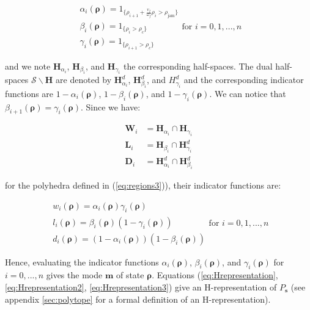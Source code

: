 \begin{equation}
\begin{array}{l}
\alpha_{i}(\boldsymbol\rho)=1_{\{\rho_{i+1} + \frac{v_{f}}{\omega_{f}}\rho_{i}>\rho_{\text{jam}}\}}\\
\beta_{i}(\boldsymbol\rho)=1_{\{\rho_{i}>\rho_{c}\}}\\
\gamma_{i}(\boldsymbol\rho)=1_{\{\rho_{i+1}>\rho_{c}\}}
\end{array}
\text{for }i=0,1,...,n
\label{eq:indicators}
\end{equation}

\noindent and we note $\textbf{H}_{\alpha_{i}}$, $\textbf{H}_{\beta_{i}}$, and $\textbf{H}_{\gamma_{i}}$ the corresponding half-spaces. The dual half-spaces $\mathcal{S}\backslash \textbf{H}$ are denoted by $\textbf{H}^{d}_{\alpha_{i}}$, $\textbf{H}^{d}_{\beta_{i}}$, and $H^{d}_{\gamma_{i}}$ and the corresponding indicator functions are $1-\alpha_{i}(\boldsymbol\rho)$, $1-\beta_{i}(\boldsymbol\rho)$, and $1-\gamma_{i}(\boldsymbol\rho)$. We can notice that $\beta_{i+1}(\boldsymbol\rho)=\gamma_{i}(\boldsymbol\rho)$. Since we have:

\begin{equation}
\begin{array}{ll}
\textbf{W}_{i}&=\textbf{H}_{\alpha_{i}}\cap \textbf{H}_{\gamma_{i}}\\
\textbf{L}_{i}&=\textbf{H}_{\beta_{i}}\cap \textbf{H}^{d}_{\gamma_{i}}\\
\textbf{D}_{i}&=\textbf{H}^{d}_{\alpha_{i}}\cap \textbf{H}^{d}_{\beta_{i}}
\end{array}
\label{eq:Hrepresentation3}
\end{equation}

\noindent for the polyhedra defined in (\ref{eq:regions3})), their indicator functions are:

\begin{equation}
\begin{array}{l}
w_{i}(\boldsymbol\rho)=\alpha_{i}(\boldsymbol\rho)\gamma_{i}(\boldsymbol\rho)\\
l_{i}(\boldsymbol\rho)=\beta_{i}(\boldsymbol\rho)(1-\gamma_{i}(\boldsymbol\rho))\\
d_{i}(\boldsymbol\rho)=(1-\alpha_{i}(\boldsymbol\rho))(1-\beta_{i}(\boldsymbol\rho))
\end{array}
\text{for }i=0,1,...,n
\label{eq:indicators2}
\end{equation}

Hence, evaluating the indicator functions $\alpha_{i}(\boldsymbol\rho)$, $\beta_{i}(\boldsymbol\rho)$, and $\gamma_{i}(\boldsymbol\rho)$ for $i=0,...,n$ gives the mode $\boldsymbol m$ of state $\boldsymbol\rho$. Equations (\ref{eq:Hrepresentation}, \ref{eq:Hrepresentation2}, \ref{eq:Hrepresentation3}) give an H-representation of $P_{\boldsymbol s}$ (see appendix \ref{sec:polytope} for a formal definition of an H-representation).


